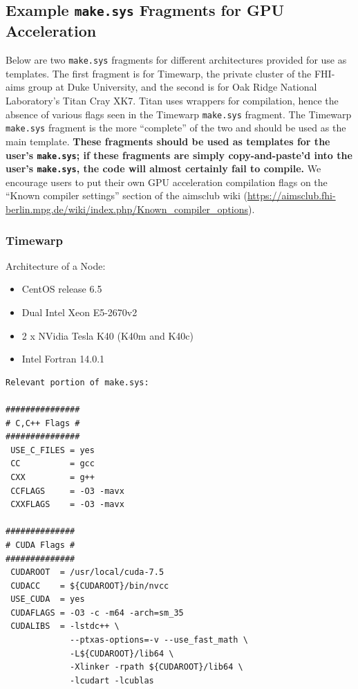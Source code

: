 \subsection{Example \texttt{make.sys} Fragments for GPU Acceleration}

Below are two \texttt{make.sys} fragments for different architectures provided for use as templates.  The first fragment is for Timewarp, the private cluster of the FHI-aims group at Duke University, and the second is for Oak Ridge National Laboratory's Titan Cray XK7.  Titan uses wrappers for compilation, hence the absence of various flags seen in the Timewarp \texttt{make.sys} fragment.  The Timewarp \texttt{make.sys} fragment is the more ``complete'' of the two and should be used as the main template.  \textbf{These fragments should be used as templates for the user's \texttt{make.sys}; if these fragments are simply copy-and-paste'd into the user's \texttt{make.sys}, the code will almost certainly fail to compile.}  We encourage users to put their own GPU acceleration compilation flags on the ``Known compiler settings'' section of the aimsclub wiki (\url{https://aimsclub.fhi-berlin.mpg.de/wiki/index.php/Known\_compiler\_options}).

\subsubsection{Timewarp}

Architecture of a Node:
\begin{itemize}
	\item CentOS release 6.5
	\item Dual Intel Xeon E5-2670v2
	\item 2 x NVidia Tesla K40 (K40m and K40c)
	\item Intel Fortran 14.0.1
\end{itemize}

\begin{verbatim}
Relevant portion of make.sys:

###############
# C,C++ Flags #
###############
 USE_C_FILES = yes 
 CC          = gcc 
 CXX         = g++ 
 CCFLAGS     = -O3 -mavx 
 CXXFLAGS    = -O3 -mavx

##############
# CUDA Flags #
##############
 CUDAROOT  = /usr/local/cuda-7.5
 CUDACC    = ${CUDAROOT}/bin/nvcc
 USE_CUDA  = yes
 CUDAFLAGS = -O3 -c -m64 -arch=sm_35
 CUDALIBS  = -lstdc++ \
             --ptxas-options=-v --use_fast_math \
             -L${CUDAROOT}/lib64 \
             -Xlinker -rpath ${CUDAROOT}/lib64 \
             -lcudart -lcublas
\end{verbatim}

